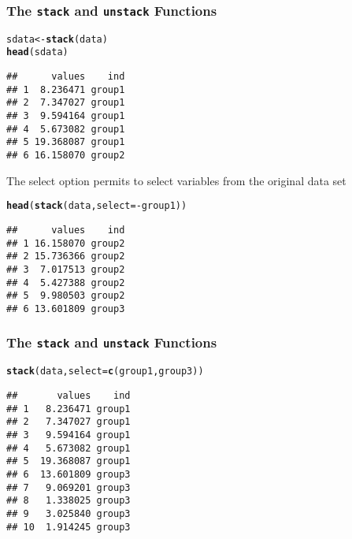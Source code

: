 \documentclass[paper=screen,mathserif]{beamer}\usepackage[]{graphicx}\usepackage[]{color}
\makeatletter
\newcommand{\hlopt}[1]{\textcolor[rgb]{0,0,0}{#1}}%
\newcommand{\hlstd}[1]{\textcolor[rgb]{0.345,0.345,0.345}{#1}}%
\newcommand{\hlkwb}[1]{\textcolor[rgb]{0.69,0.353,0.396}{#1}}%
\newcommand{\hlkwc}[1]{\textcolor[rgb]{0.333,0.667,0.333}{#1}}%
\newcommand{\hlkwd}[1]{\textcolor[rgb]{0.737,0.353,0.396}{\textbf{#1}}}%
\newenvironment{kframe}{%
 \def\at@end@of@kframe{}%
 \ifinner\ifhmode%
  \def\at@end@of@kframe{\end{minipage}}%
  \begin{minipage}{\columnwidth}%
 \fi\fi%
 \def\FrameCommand##1{\hskip\@totalleftmargin \hskip-\fboxsep
 \colorbox{shadecolor}{##1}\hskip-\fboxsep
     \hskip-\linewidth \hskip-\@totalleftmargin \hskip\columnwidth}%
 \MakeFramed {\advance\hsize-\width
   \@totalleftmargin\z@ \linewidth\hsize
   \@setminipage}}%
 {\par\unskip\endMakeFramed%
 \at@end@of@kframe}
\newenvironment{knitrout}{}{} %
\newcommand{\ft}[1]{\frametitle{#1}}
\makeatother
\begin{document}
\begin{frame}[fragile]
  \ft{The {\tt stack} and {\tt unstack} Functions}

\begin{knitrout}\scriptsize
{}\color{fgcolor}\begin{kframe}
\begin{alltt}
\hlstd{sdata} \hlkwb{<-} \hlkwd{stack}\hlstd{(data)}
\hlkwd{head}\hlstd{(sdata)}
\end{alltt}
\begin{verbatim}
##      values    ind
## 1  8.236471 group1
## 2  7.347027 group1
## 3  9.594164 group1
## 4  5.673082 group1
## 5 19.368087 group1
## 6 16.158070 group2
\end{verbatim}
\end{kframe}
\end{knitrout}

{\small The select option permits to select variables from the
  original data set}
\begin{knitrout}\scriptsize
{}\color{fgcolor}\begin{kframe}
\begin{alltt}
\hlkwd{head}\hlstd{(}\hlkwd{stack}\hlstd{(data,} \hlkwc{select} \hlstd{=} \hlopt{-}\hlstd{group1))}
\end{alltt}
\begin{verbatim}
##      values    ind
## 1 16.158070 group2
## 2 15.736366 group2
## 3  7.017513 group2
## 4  5.427388 group2
## 5  9.980503 group2
## 6 13.601809 group3
\end{verbatim}
\end{kframe}
\end{knitrout}

\end{frame}

\begin{frame}[fragile]
  \ft{The {\tt stack} and {\tt unstack} Functions}
  
\begin{knitrout}\scriptsize
{}\color{fgcolor}\begin{kframe}
\begin{alltt}
\hlkwd{stack}\hlstd{(data,} \hlkwc{select} \hlstd{=} \hlkwd{c}\hlstd{(group1, group3))}
\end{alltt}
\begin{verbatim}
##       values    ind
## 1   8.236471 group1
## 2   7.347027 group1
## 3   9.594164 group1
## 4   5.673082 group1
## 5  19.368087 group1
## 6  13.601809 group3
## 7   9.069201 group3
## 8   1.338025 group3
## 9   3.025840 group3
## 10  1.914245 group3
\end{verbatim}
\end{kframe}
\end{knitrout}

\end{frame}
\end{document}
